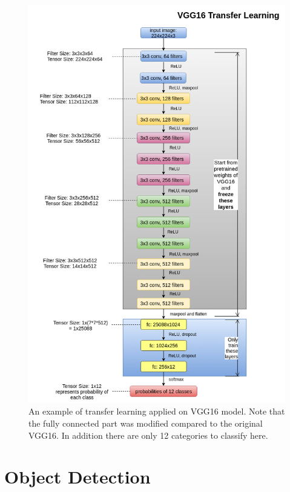 \begin{figure}[tb]
	\centering
	\includegraphics[width=0.9\hsize]{./figures/transferedVgg16}
	\caption{An example of transfer learning applied on VGG16 model. Note that the fully connected part was modified compared to the original VGG16. In addition there are only 12 categories to classify here.}
	\label{fig:transferedVgg16}
\end{figure}


\section{Object Detection}
\label{sec:objDetect}
